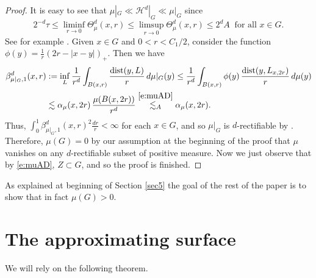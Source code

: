 \documentclass[11pt]{amsart}
\newcommand{\dist}{{\rm dist}}
\newcommand{\vv}{{\vspace{2mm}}}
\theoremstyle{definition}
\theoremstyle{remark}
\numberwithin{equation}{section}
\def\cH{{\mathcal{H}}}
\def\lec{\lesssim}
\def\lec{\lesssim}
\begin{document}
\begin{proof}
	It is easy to see that $\mu|_{G}\ll \cH^{d}|_{G}\ll \mu|_{G}$ since
	\begin{equation}\label{e:t<theta<A}
	2^{-d}\tau\leq \liminf_{r\rightarrow 0} \Theta_{\mu}^{d}(x,r) 
	\leq  \limsup_{r\rightarrow 0} \Theta_{\mu}^{d}(x,r) 
	\leq 2^{d} A \;\; \mbox{for all }x\in G.
	\end{equation}
	See for example \cite[Theorem 6.9]{Mattila}. Given $x\in G$ and $0<r<C_{1}/2$,
consider the function $\phi(y) = \frac1r(2r-|x-y|)_+$. Then we have	
	\begin{align}\label{eq514}
	\beta_{\mu|_{G},1}^{d}(x,r)
	& :=\inf_{L}\frac{1}{r^{d}}\int_{B(x,r)}\frac{\dist(y,L)}{r}\, d\mu|_{G}(y)
	 \leq \frac{1}{r^{d}}\int_{B(x,r)} \phi(y)\,\frac{\dist(y,L_{x,2r})}{r}\,d\mu(y)\\
	& \lec \alpha_{\mu}(x,2r)\,\frac{\mu(B(x,2r))}{r^{d}}
	\stackrel{\eqref{e:muAD}}{\lec_{A}} \alpha_{\mu}(x,2r).\nonumber
	\end{align}
	Thus, $	\int_{0}^{1} \beta_{\mu|_{G},1}^{d}(x,r)^{2}\frac{dr}{r}<\infty$ for each $x\in G$, and so $\mu|_{G}$ is $d$-rectifiable by \cite[Theorem A]{BS16}. Therefore, $\mu(G)=0$ by our assumption at the beginning of the proof that $\mu$ vanishes on any $d$-rectifiable subset of positive measure. Now we just observe that by \eqref{e:muAD}, $Z\subset G$, and so the proof is finished. 
\end{proof}

As explained at beginning of Section \ref{sec5} the goal of the rest of the paper is to show that in fact $\mu(G)>0$.

\vv

\section{The approximating surface}\label{approximating}


We will rely on the following theorem.
\end{document}
